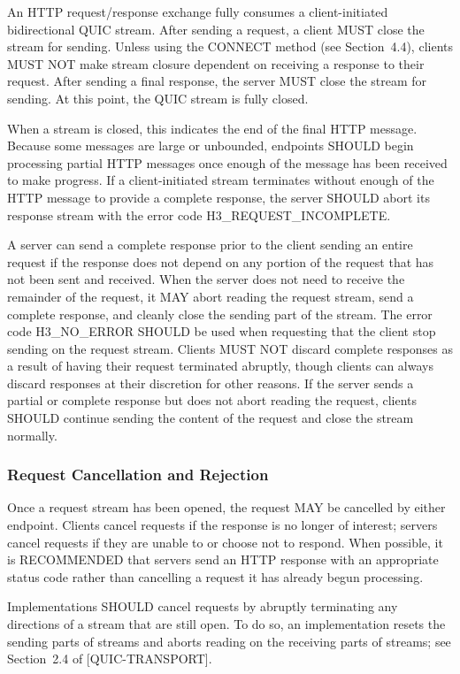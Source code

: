 \documentclass{article}
\begin{document}
An HTTP request/response exchange fully consumes a client-initiated bidirectional QUIC stream.  After sending a request, a client MUST close the stream for sending.  Unless using the CONNECT method (see Section~4.4), clients MUST NOT make stream closure dependent on receiving a response to their request.  After sending a final response, the server MUST close the stream for sending.  At this point, the QUIC stream is fully closed.

When a stream is closed, this indicates the end of the final HTTP message.  Because some messages are large or unbounded, endpoints SHOULD begin processing partial HTTP messages once enough of the message has been received to make progress.  If a client-initiated stream terminates without enough of the HTTP message to provide a complete response, the server SHOULD abort its response stream with the error code H3\_REQUEST\_INCOMPLETE.

A server can send a complete response prior to the client sending an entire request if the response does not depend on any portion of the request that has not been sent and received.  When the server does not need to receive the remainder of the request, it MAY abort reading the request stream, send a complete response, and cleanly close the sending part of the stream.  The error code H3\_NO\_ERROR SHOULD be used when requesting that the client stop sending on the request stream.  Clients MUST NOT discard complete responses as a result of having their request terminated abruptly, though clients can always discard responses at their discretion for other reasons. If the server sends a partial or complete response but does not abort reading the request, clients SHOULD continue sending the content of the request and close the stream normally.

\subsubsection{Request Cancellation and Rejection}

Once a request stream has been opened, the request MAY be cancelled by either endpoint.  Clients cancel requests if the response is no longer of interest; servers cancel requests if they are unable to or choose not to respond.  When possible, it is RECOMMENDED that servers send an HTTP response with an appropriate status code rather than cancelling a request it has already begun processing.

Implementations SHOULD cancel requests by abruptly terminating any directions of a stream that are still open.  To do so, an implementation resets the sending parts of streams and aborts reading on the receiving parts of streams; see Section~2.4 of [QUIC-TRANSPORT].
\end{document}
